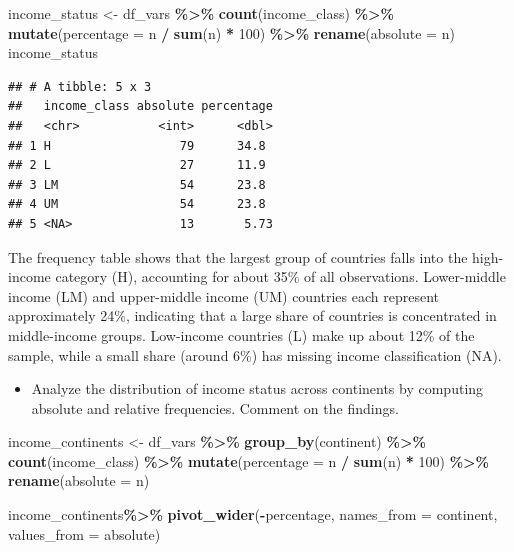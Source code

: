 \documentclass[
]{article}
\newenvironment{Shaded}{\begin{snugshade}}{\end{snugshade}}
\newcommand{\AttributeTok}[1]{\textcolor[rgb]{0.13,0.29,0.53}{#1}}
\newcommand{\DecValTok}[1]{\textcolor[rgb]{0.00,0.00,0.81}{#1}}
\newcommand{\FunctionTok}[1]{\textcolor[rgb]{0.13,0.29,0.53}{\textbf{#1}}}
\newcommand{\NormalTok}[1]{#1}
\newcommand{\OtherTok}[1]{\textcolor[rgb]{0.56,0.35,0.01}{#1}}
\newcommand{\SpecialCharTok}[1]{\textcolor[rgb]{0.81,0.36,0.00}{\textbf{#1}}}
\providecommand{\tightlist}{%
  \setlength{\itemsep}{0pt}\setlength{\parskip}{0pt}}
\begin{document}
\begin{Shaded}
\begin{Highlighting}[]
\NormalTok{income\_status }\OtherTok{\textless{}{-}}\NormalTok{ df\_vars }\SpecialCharTok{\%\textgreater{}\%}
  \FunctionTok{count}\NormalTok{(income\_class) }\SpecialCharTok{\%\textgreater{}\%}
  \FunctionTok{mutate}\NormalTok{(}\AttributeTok{percentage =}\NormalTok{ n }\SpecialCharTok{/} \FunctionTok{sum}\NormalTok{(n) }\SpecialCharTok{*} \DecValTok{100}\NormalTok{) }\SpecialCharTok{\%\textgreater{}\%}
  \FunctionTok{rename}\NormalTok{(}\AttributeTok{absolute =}\NormalTok{ n)}
\NormalTok{income\_status}
\end{Highlighting}
\end{Shaded}

\begin{verbatim}
## # A tibble: 5 x 3
##   income_class absolute percentage
##   <chr>           <int>      <dbl>
## 1 H                  79      34.8 
## 2 L                  27      11.9 
## 3 LM                 54      23.8 
## 4 UM                 54      23.8 
## 5 <NA>               13       5.73
\end{verbatim}

The frequency table shows that the largest group of countries falls into
the high-income category (H), accounting for about 35\% of all
observations. Lower-middle income (LM) and upper-middle income (UM)
countries each represent approximately 24\%, indicating that a large
share of countries is concentrated in middle-income groups. Low-income
countries (L) make up about 12\% of the sample, while a small share
(around 6\%) has missing income classification (NA).

\begin{itemize}
\tightlist
\item
  Analyze the distribution of income status across continents by
  computing absolute and relative frequencies. Comment on the findings.
\end{itemize}

\begin{Shaded}
\begin{Highlighting}[]
\NormalTok{income\_continents }\OtherTok{\textless{}{-}}\NormalTok{ df\_vars }\SpecialCharTok{\%\textgreater{}\%}
  \FunctionTok{group\_by}\NormalTok{(continent) }\SpecialCharTok{\%\textgreater{}\%}
  \FunctionTok{count}\NormalTok{(income\_class) }\SpecialCharTok{\%\textgreater{}\%}
  \FunctionTok{mutate}\NormalTok{(}\AttributeTok{percentage =}\NormalTok{ n }\SpecialCharTok{/} \FunctionTok{sum}\NormalTok{(n) }\SpecialCharTok{*} \DecValTok{100}\NormalTok{) }\SpecialCharTok{\%\textgreater{}\%}
  \FunctionTok{rename}\NormalTok{(}\AttributeTok{absolute =}\NormalTok{ n)}

\NormalTok{income\_continents}\SpecialCharTok{\%\textgreater{}\%}
  \FunctionTok{pivot\_wider}\NormalTok{(}\SpecialCharTok{{-}}\NormalTok{percentage, }\AttributeTok{names\_from =}\NormalTok{ continent, }\AttributeTok{values\_from =}\NormalTok{ absolute)}
\end{Highlighting}
\end{Shaded}
\end{document}
